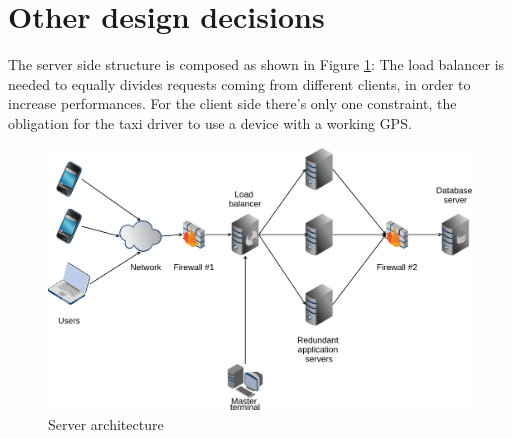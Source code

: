 \section{Other design decisions}
The server side structure is composed as shown in Figure \ref{fig:hwarch}:
The load balancer is needed to equally divides requests coming from different clients, in order to increase performances.
For the client side there's only one constraint, the obligation for the taxi driver to use a device with a working GPS.

\begin{figure} [h]
  \centering
  \includegraphics[scale=0.35]{../../architecture/architecture.png}
\caption{Server architecture \label{fig:hwarch}}
\end{figure}
